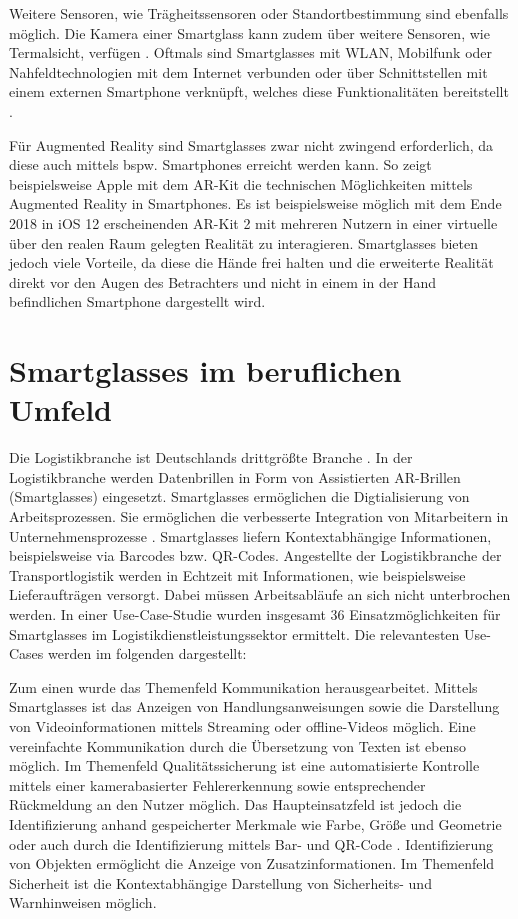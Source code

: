 Weitere Sensoren, wie Trägheitssensoren oder Standortbestimmung sind ebenfalls möglich. Die Kamera einer Smartglass kann zudem über weitere Sensoren, wie Termalsicht, verfügen \cite[S.~27]{Schwenke2016}. Oftmals sind Smartglasses mit WLAN, Mobilfunk oder Nahfeldtechnologien mit dem Internet verbunden oder über Schnittstellen mit einem externen Smartphone verknüpft, welches diese Funktionalitäten bereitstellt \cite[S.~28]{Schwenke2016}.

Für Augmented Reality sind Smartglasses zwar nicht zwingend erforderlich, da diese auch mittels bspw. Smartphones erreicht werden kann. So zeigt beispielsweise Apple mit dem AR-Kit \cite{Apple2018} die technischen Möglichkeiten mittels Augmented Reality in Smartphones. Es ist beispielsweise möglich mit dem Ende 2018 in iOS 12 erscheinenden AR-Kit 2 mit mehreren Nutzern in einer virtuelle über den realen Raum gelegten Realität zu interagieren. Smartglasses bieten jedoch viele Vorteile, da diese die Hände frei halten und die erweiterte Realität direkt vor den Augen des Betrachters und nicht in einem in der Hand befindlichen Smartphone dargestellt wird.
%
%
\section{Smartglasses im beruflichen Umfeld} 
Die Logistikbranche ist Deutschlands drittgrößte Branche \cite{Zobel2016}. In der Logistikbranche werden Datenbrillen in Form von Assistierten AR-Brillen (Smartglasses) eingesetzt. Smartglasses ermöglichen die Digtialisierung von Arbeitsprozessen. Sie ermöglichen die verbesserte Integration von Mitarbeitern in Unternehmensprozesse \cite{Zobel2016}. Smartglasses liefern Kontextabhängige Informationen, beispielsweise via Barcodes bzw. QR-Codes. Angestellte der Logistikbranche der Transportlogistik werden in Echtzeit mit Informationen, wie beispielsweise Lieferaufträgen versorgt. Dabei müssen Arbeitsabläufe an sich nicht unterbrochen werden. In einer Use-Case-Studie \cite{Niemoller2017} wurden insgesamt 36 Einsatzmöglichkeiten für Smartglasses im Logistikdienstleistungssektor ermittelt. Die relevantesten Use-Cases werden im folgenden dargestellt:

Zum einen wurde das Themenfeld Kommunikation herausgearbeitet. Mittels Smartglasses ist das Anzeigen von Handlungsanweisungen sowie die Darstellung von Videoinformationen mittels Streaming oder offline-Videos möglich. Eine vereinfachte Kommunikation durch die Übersetzung von Texten ist ebenso möglich. Im Themenfeld Qualitätssicherung ist eine automatisierte Kontrolle mittels einer kamerabasierter Fehlererkennung sowie entsprechender Rückmeldung an den Nutzer möglich. Das Haupteinsatzfeld ist jedoch die Identifizierung anhand gespeicherter Merkmale wie Farbe, Größe und Geometrie oder auch durch die Identifizierung mittels Bar- und QR-Code \cite{Niemoller2017}. Identifizierung von Objekten ermöglicht die Anzeige von Zusatzinformationen. Im Themenfeld Sicherheit ist die Kontextabhängige Darstellung von Sicherheits- und Warnhinweisen möglich. 

